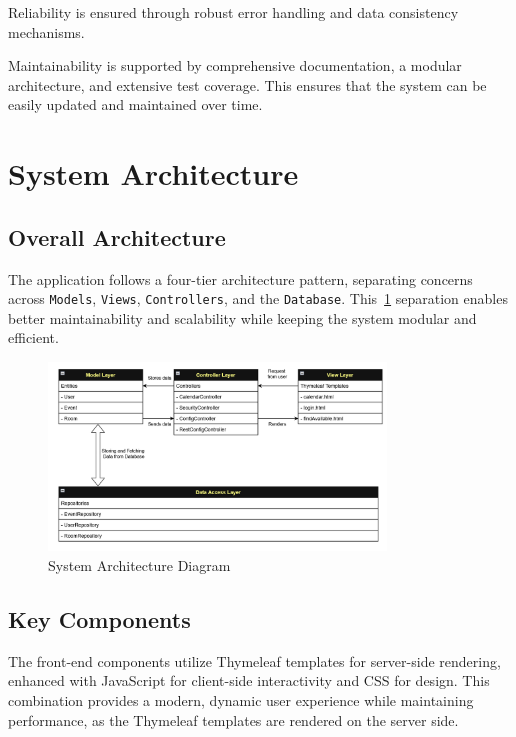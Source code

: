 Reliability is ensured through robust error handling and data consistency mechanisms.

Maintainability is supported by comprehensive documentation, a modular architecture, and extensive test coverage.
This ensures that the system can be easily updated and maintained over time.


\section{System Architecture}\label{sec:system-architecture}

\subsection{Overall Architecture}\label{subsec:overall-architecture}
The application follows a four-tier architecture pattern, separating concerns across \texttt{Models}, \texttt{Views}, \texttt{Controllers}, and the \texttt{Database}.
This~\ref{fig:architecture} separation enables better maintainability and scalability while keeping the system modular and efficient.

\begin{figure}[h]
    \centering
    \includegraphics[width=0.8\textwidth]{MVCSchema}
    \caption{System Architecture Diagram}
    \label{fig:architecture}
\end{figure}

\subsection{Key Components}\label{subsec:key-components}

The front-end components utilize Thymeleaf templates for server-side rendering, enhanced with JavaScript for client-side interactivity and CSS for design.
This combination provides a modern, dynamic user experience while maintaining performance, as the Thymeleaf templates are rendered on the server side.

